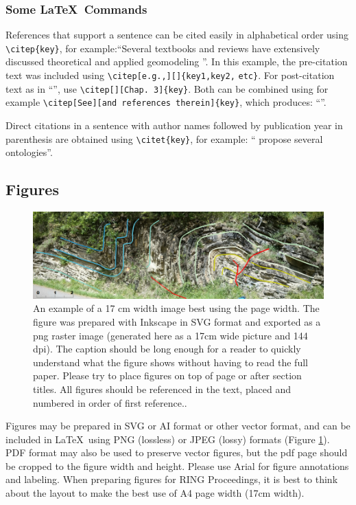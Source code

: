 \documentclass[final]{ring}
\begin{document}
\subsubsection{Some \LaTeX\ Commands}

References that support a sentence can be cited easily in alphabetical order using \verb|\citep{key}|, for example:``Several textbooks and reviews have extensively discussed theoretical and applied geomodeling \citep[e.g.,][]{Mallet2002, Mallet2014, Perrin2013, Ringrose2015, Wellmann2018AG}''. In this example, the pre-citation text was included using \verb|\citep[e.g.,][]{key1,key2,| \verb|etc}|. For post-citation text as in ``\citep[chap. 3][]{Mallet2002}'', use \verb|\citep[][Chap. 3]{key}|. Both can be combined using for example \verb|\citep[See][and references therein]{key}|, which produces: ``\citep[See][and references therein]{Wellmann2018AG}''. 

Direct citations in a sentence with author names followed by publication year in parenthesis are obtained using \verb|\citet{key}|, for example: ``\citet{Perrin2013} propose several ontologies''. 

\subsection{Figures}
\begin{figure}
\centering\includegraphics[width=\textwidth]{Hecho}
\caption{An example of a 17 cm width image best using the page width. The figure was prepared with Inkscape in SVG format and exported as a png raster image (generated here as a 17cm wide picture and 144 dpi). The caption should be long enough for a reader to quickly understand what the figure shows without having to read the full paper. Please try to place figures on top of page or after section titles. All figures should be referenced in the text, placed and numbered in order of first reference..}
\label{fig:example}
\end{figure}

Figures may be prepared in SVG or AI format or other vector format, and can be included in \LaTeX\ using PNG (lossless) or JPEG (lossy) formats (Figure \ref{fig:example}). PDF format may also be used to preserve vector figures, but the pdf page should be cropped to the figure width and height. Please use Arial for figure annotations and labeling. When preparing figures for RING Proceedings, it is best to think about the layout to make the best use of A4 page width (17cm width). 
\end{document}
